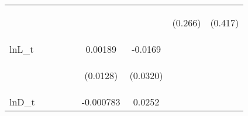 \documentclass[]{article}
\begin{document}
\begin{center}
\begin{tabular}{lcccccccc}
\vspace{4pt} & \begin{footnotesize}\end{footnotesize} & \begin{footnotesize}\end{footnotesize} & \begin{footnotesize}\end{footnotesize} & \begin{footnotesize}\end{footnotesize} & \begin{footnotesize}\end{footnotesize} & \begin{footnotesize}\end{footnotesize} & \begin{footnotesize}(0.266)\end{footnotesize} & \begin{footnotesize}(0.417)\end{footnotesize} \\
lnL\_t &  &  &  &  & 0.00189 & -0.0169 &  &  \\
\vspace{4pt} & \begin{footnotesize}\end{footnotesize} & \begin{footnotesize}\end{footnotesize} & \begin{footnotesize}\end{footnotesize} & \begin{footnotesize}\end{footnotesize} & \begin{footnotesize}(0.0128)\end{footnotesize} & \begin{footnotesize}(0.0320)\end{footnotesize} & \begin{footnotesize}\end{footnotesize} & \begin{footnotesize}\end{footnotesize} \\
lnD\_t &  &  &  &  & -0.000783 & 0.0252 &  &  \\

\end{tabular}
\end{center}
\end{document}
